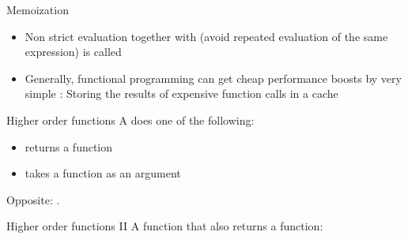 \begin{frame}[t]{Memoization}
	\begin{itemize}
		\item<+-> Non strict evaluation together with  (avoid repeated evaluation of the same expression) is called 
		\item<+-> Generally, functional programming can get cheap performance boosts by very simple : Storing the results of expensive  function calls in a cache
		
	\end{itemize}
\end{frame}

\begin{frame}[t]{Higher order functions}
	A  does one of the following:
	\begin{itemize}
		\item returns a function
		\item takes a function as an argument
	\end{itemize}
	Opposite: .
	
	\medskip 
	

\end{frame}

\begin{frame}{Higher order functions II}
	A function that also returns a function:
	
	\inputminted[]{python}{code/paradigms/fp/higher_order_2.py}
\end{frame}

